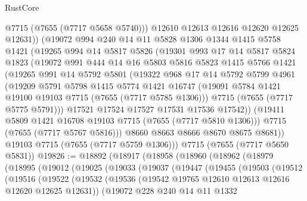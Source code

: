 \begin{lexlean}{RustCore}
\begin{coremodule}
          @7715
          (@7655 (@7717 @5658 @5740)))
        @12610
        @12613
        @12616
        @12620
        @12625
        @12631))
    (@19072
      @994
      @240
      @14
      @11
      @5828
      @1306
      @1344
      @1415
      @5758
      @1421
      (@19265
        @994
        @14
        @5817
        @5826
        (@19301
          @993
          @17
          @14
          @5817
          @5824
          @1823
          (@19072
            @991
            @444
            @14
            @16
            @5803
            @5816
            @5823
            @1415
            @5766
            @1421
            (@19265
              @991
              @14
              @5792
              @5801
              (@19322
                @968
                @17
                @14
                @5792
                @5799
                @4961
                (@19209
                  @5791
                  @5798
                  @1415
                  @5774
                  @1421
                  @16747
                  (@19091 @5784 @1421 @19100 @19103 @7715 (@7655 (@7717 @5785 @1306)))
                  @7715
                  (@7655 (@7717 @5775 @5791)))
                @17521
                @17524
                @17527
                @17531
                @17536
                @17542))
            (@19411 @5809 @1421 @16708 @19103 @7715 (@7655 (@7717 @5810 @1306)))
            @7715
            (@7655 (@7717 @5767 @5816)))
          @8660
          @8663
          @8666
          @8670
          @8675
          @8681))
      @19103
      @7715
      (@7655 (@7717 @5759 @1306)))
    @7715
    (@7655 (@7717 @5650 @5831))
@19826 := @18892
    (@18917
      (@18958
        (@18960
          (@18962
            (@18979
              (@18995
                (@19012
                  (@19025
                    (@19033
                      (@19037
                        (@19447
                          (@19455
                            (@19503
                              (@19512
                                (@19516
                                  (@19522
                                    (@19532
                                      (@19536
                                        (@19542 @19765 @12610 @12613 @12616 @12620 @12625 @12631))
                                      (@19072
                                        @228
                                        @240
                                        @14
                                        @11
                                        @1332

\end{coremodule}
\end{lexlean}
